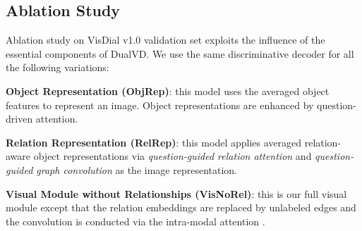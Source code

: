 \documentclass[letterpaper]{article} \usepackage{aaai20}  \usepackage{times}  \usepackage{helvet} \usepackage{courier}  \usepackage[hyphens]{url}  \usepackage{graphicx} \urlstyle{rm} \def\UrlFont{\rm}  \usepackage{graphicx}  \frenchspacing  \setlength{\pdfpagewidth}{8.5in}  \setlength{\pdfpageheight}{11in}  \usepackage{mathrsfs} \usepackage{amsfonts,amssymb}  \usepackage{tabularx} \usepackage{url}
\begin{document}
\begin{table}[t] 
\caption{Comparison on test-standard split of VisDial v1.0.}
\label{v1}
\end{table}



\subsection{Ablation Study}

Ablation study on VisDial v1.0 validation set exploits the influence of the essential components of DualVD. We use the same discriminative decoder for all the following variations:

\textbf{Object Representation (ObjRep)}: this model uses the averaged object features to represent an image. Object representations are enhanced by question-driven attention.



\textbf{Relation Representation (RelRep)}: this model applies averaged relation-aware object representations via \emph{question-guided relation attention} and \emph{question-guided graph convolution} as the image representation. 

\textbf{Visual Module without Relationships (VisNoRel)}: this is our full visual module except that the relation embeddings are replaced by unlabeled edges and the convolution is conducted via the intra-modal attention \cite{gao2019dynamic}.
\end{document}
